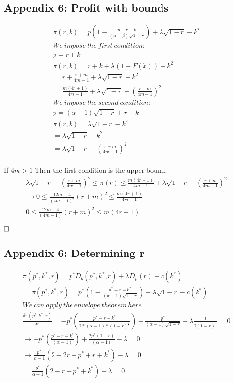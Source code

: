 \documentclass{article}
\begin{document}
\subsection{Appendix 6: Profit with bounds}
\[
\begin{array}{ll}
\pi(r,k) = p(1 - \frac{p-r-k}{(\alpha - \beta) \sqrt{1-r} }) + \lambda \sqrt{1-r}- k^2 \\
We~impose~the~first~condition:  \\
p=r+k \\
\pi(r,k)=r+k + \lambda (1-F(\check{x}) )- k^2 \\
= r + \frac{r+m}{4m-1} + \lambda \sqrt{1-r}- k^2\\
= \frac{m(4r+1)}{4m-1} + \lambda \sqrt{1-r}- (\frac{r+m}{4m-1})^2\\
We~impose~the~second~condition: \\ 
p = (\alpha-1)\sqrt{1-r}+r+k \\
\pi(r,k)= \lambda \sqrt{1-r}- k^2 \\
= \lambda \sqrt{1-r}- k^2 \\
= \lambda \sqrt{1-r}- (\frac{r+m}{4m-1})^2 \\
\end{array}
\]

If $4m>1$
Then the first condition is the upper bound. 
\[
\begin{array}{ll}
\lambda \sqrt{1-r}- (\frac{r+m}{4m-1})^2 \leq \pi(r) \leq \frac{m(4r+1)}{4m-1} + \lambda \sqrt{1-r}- (\frac{r+m}{4m-1})^2 \\
\rightarrow 0 \leq \frac{12m-4}{(4m-1)^2}\left(r+m \right)^2 \leq \frac{m(4r+1)}{4m-1} \\
0 \leq \frac{12m-4}{(4m-1)}\left(r+m \right)^2 \leq m(4r+1)
\end{array}
\]

$\hfill \square$



\subsection{Appendix 6: Determining r}

\[
\begin{array}{ll}
\pi(p^*,k^*,r) = p^*D_b(p^*,k^*,r) + \lambda D_p(r) - c(k^*) \\
=\pi(p^*,k^*,r) = p^*(1-\frac{p^*-r-k^*}{(\alpha -1)\sqrt{1-r}}) + \lambda \sqrt{1-r} - c(k^*) \\
We~can~apply~the~envelope~theorem~here~:\\
\frac{\delta \pi(p^*,k^*,r)}{\delta r}  = -p^*\left(\frac{p^*-r-k^*}{2*(\alpha-1)*(1-r)^{\frac{3}{2}}} \right)+\frac{p^*}{(\alpha-1)\sqrt{1-r}} - \lambda \frac{1}{2(1-r)^{\frac{3}{2}}} = 0 \\
\rightarrow -p^*\left(\frac{p^*-r-k^*}{(\alpha-1)} \right)+\frac{2p^*(1-r)}{(\alpha-1)} - \lambda = 0 \\
\rightarrow \frac{p^*}{\alpha-1}\left(2-2r-p^*+r+k^* \right) -\lambda = 0 \\
= \frac{p^*}{\alpha-1}\left(2-r-p^*+k^* \right) -\lambda = 0
\end{array}
\]
\end{document}
